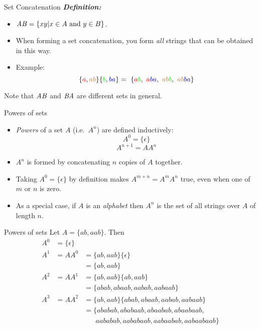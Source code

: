 \documentclass[style=sailor,size=12pt]{powerdot}
\begin{document}
\begin{slide}[bm=,toc=]{Set Concatenation}
\emph{\textbf{Definition:}}
\begin{itemize}
   \item  $\mathit{AB} = \{xy | x \in A \text{ and } y \in B\}$. 
   \item When forming a set concatenation, you form \emph{all} strings that can be obtained in this way.
   \item Example:
   \[\{\textcolor{red}{a},\textcolor{brown}{ab}\}\{\textcolor{green}{b},\textcolor{blue}{ba}\} = \
                      \{\textcolor{red}{a}\textcolor{green}{b}, \
                        \textcolor{red}{a}\textcolor{blue}{ba}, \
                        \textcolor{brown}{ab}\textcolor{green}{b}, \
                        \textcolor{brown}{ab}\textcolor{blue}{ba}\}
   \]
\end{itemize} 
   Note that $\mathit{AB}$ and $\mathit{BA}$ are different sets in general.
\end{slide}


\begin{slide}[bm=,toc=]{Powers of sets}
\begin{itemize}
\item \emph{Powers} of a set $A$ (i.e.\ $A^n$) are defined inductively:
\[
  A^0 = \{\epsilon\}
\]
\[
  A^{n+1} = AA^n
\]

\item $A^n$ is formed by concatenating $n$ copies of $A$ together. 
\item Taking $A^0 = \{\epsilon\}$ by definition makes $A^{m+n} = A^mA^n$ true, 
      even when one of $m$ or $n$ is zero. 
\item As a special case, if $A$ is an \emph{alphabet} then $A^n$ is the set of all strings
over $A$ of length $n$.
\end{itemize}
\end{slide}

\begin{slide}[bm=,toc=]{Powers of sets}
Let $A = \{ab,aab\}$. Then
\[
\begin{array}{lll}
A^0 &= \{\epsilon\} & \\[2ex]

A^1 &= AA^0         &= \{ab,aab\}\{\epsilon\} \\
    &               &= \{ab,aab\} \\[2ex]

A^2 &= AA^1         &= \{ab,aab\}\{ab,aab\}   \\
    &               &= \{abab,abaab,aabab,aabaab\} \\[2ex]

A^3 &= AA^2         &= \{ab,aab\}\{abab,abaab,aabab,aabaab\}  \\
    &               &= \{ababab,ababaab,abaabab,abaabaab,  \\
    &               &\;\;\;\;\;\;aababab,aababaab,aabaabab,aabaabaab \}  \\
\end{array}
\]
\end{slide}
\end{document}

